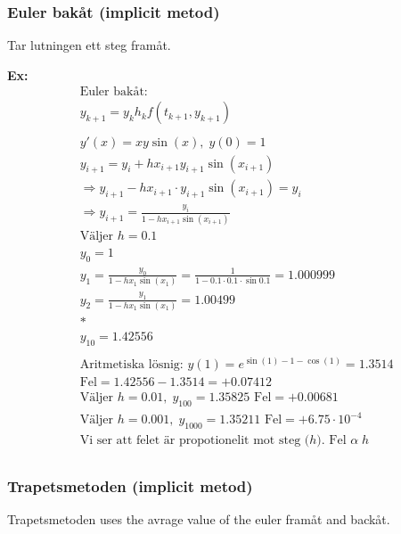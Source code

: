 \begin{multicols}{2}
\subsubsection{Euler bakåt (implicit metod)}
Tar lutningen ett steg framåt.

\textbf{Ex:}
\begin{align*}
  &\text{Euler bakåt: } \\
  &y_{k+1} = y_k h_kf(t_{k+1},y_{k+1}) \\
  &\\
  &y'(x) = xy\sin{(x)}, \; y(0)=1 \\
  &y_{i+1} = y_i + hx_{i+1}y_{i+1}\sin{(x_{i+1})} \\
  &\Rightarrow y_{i+1} -hx_{i+1}\cdot{y_{i+1}}\sin{(x_{i+1})} = y_i \\
  &\Rightarrow y_{i+1} = \frac{y_i}{1 -hx_{i+1}\sin{(x_{i+1})}} \\
  &\text{Väljer $h=0.1$} \\
  &y_0 = 1 \\
  &y_1 = \frac{y_0}{1 -hx_{1}\sin{(x_{1})}} = \frac{1}{1 -0.1\cdot0.1\cdot\sin{0.1}}
        = 1.000999 \\
  &y_2 = \frac{y_1}{1 -hx_{1}\sin{(x_{1})}} = 1.00499 \\
  &* \\
  &y_{10} = 1.42556 \\
  &\\
  &\text{Aritmetiska lösnig: } y(1)=e^{\sin{(1)-1-\cos{(1)}}} = 1.3514 \\
  &\text{Fel} = 1.42556-1.3514 = +0.07412 \\
  &\text{Väljer } h=0.01, \; y_{100} = 1.35825 \text{ Fel} = +0.00681 \\
  &\text{Väljer } h=0.001, \; y_{1000} = 1.35211 \text{ Fel} = +6.75\cdot10^{-4} \\
  &\text{Vi ser att felet är propotionelit mot steg ($h$). Fel } \alpha \; h \\
\end{align*}

\subsubsection{Trapetsmetoden (implicit metod)}
Trapetsmetoden uses the avrage value of the euler framåt and backåt.


\end{multicols}
